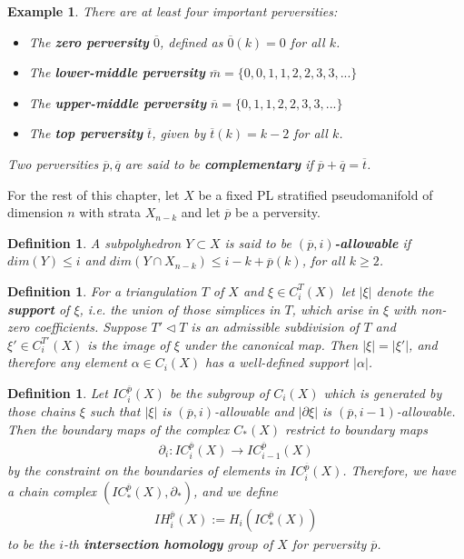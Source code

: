 \documentclass{scrreprt}
\newtheorem{definition}[prop]{Definition}
\newtheorem{example}[prop]{Example}
\begin{document}
\begin{example}
There are at least four important perversities:
\begin{itemize}
\item The \textbf{zero perversity} $\overline{0}$, defined as $\overline{0}(k)=0$ for all $k$.
\item The \textbf{lower-middle perversity} $\overline{m}= \{ 0,0,1,1,2,2,3,3,... \}$
\item The \textbf{upper-middle perversity} $\overline{n}= \{ 0,1,1,2,2,3,3,... \}$
\item The \textbf{top perversity} $\overline{t}$, given by $\overline{t}(k)=k-2$ for all $k$.
\end{itemize}
Two perversities $\overline{p}, \overline{q}$ are said to be \textbf{complementary} if $\overline{p}+ \overline{q}= \overline{t}$.
\end{example}


For the rest of this chapter, let $X$ be a fixed PL stratified pseudomanifold of dimension $n$ with strata $X_{n-k}$  and let $\overline{p}$ be a perversity.

\begin{definition}
A subpolyhedron $Y \subset X$ is said to be \textbf{$(\overline{p},i)$-allowable} if $dim(Y) \leq i$ and $dim(Y \cap X_{n-k}) \leq i-k+\overline{p}(k)$, for all $k \geq 2$.
\end{definition}

\begin{definition}
For a triangulation $T$ of $X$ and $\xi \in C_i^T(X)$ let $|\xi|$ denote the \textbf{support} of $\xi$, i.e. the union of those simplices in $T$, which arise in $\xi$ with non-zero coefficients. Suppose $T' \lhd T$ is an admissible subdivision of $T$ and $\xi' \in C_i^{T'}(X)$ is the image of $\xi$ under the canonical map. Then $|\xi|=|\xi'|$, and therefore any element $\alpha \in C_i(X)$ has a well-defined support $|\alpha|$.
\end{definition}

\begin{definition}
Let $IC_i^{\overline{p}}(X)$ be the subgroup of $C_i(X)$ which is generated by those chains $\xi$ such that $|\xi|$ is $(\overline{p},i)$-allowable and $|\partial \xi|$ is $(\overline{p},i-1)$-allowable. Then the boundary maps of the complex $C_*(X)$ restrict to boundary maps
\begin{align*}
\partial_i : IC_i^{\overline{p}}(X) \to IC_{i-1}^{\overline{p}}(X)
\end{align*}
by the constraint on the boundaries of elements in $IC_i^{\overline{p}}(X)$. Therefore, we have a chain complex $(IC_*^{\overline{p}}(X),\partial_*)$, and we define
\begin{align*}
IH_i^{\overline{p}}(X):=H_i(IC_*^{\overline{p}}(X))
\end{align*}
to be the $i$-th \textbf{intersection homology} group of $X$ for perversity $\overline{p}$.
\end{definition}
\end{document}
